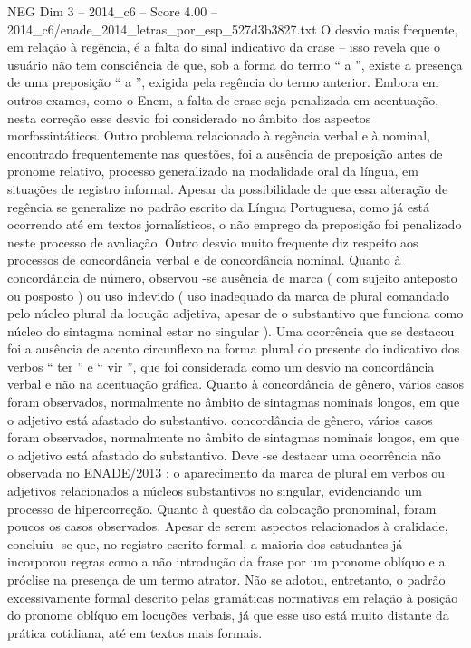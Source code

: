 \begin{textsample}{NEG Dim 3 – 2014\_c6 – Score 4.00 – 2014\_c6/enade\_2014\_letras\_por\_esp\_527d3b3827.txt}
O desvio mais frequente, em relação à regência, é a falta do sinal indicativo da crase – isso revela que o usuário não tem consciência de que, sob a forma do termo “ a ”, existe a presença de uma preposição “ a ”, exigida pela regência do termo anterior.
Embora em outros exames, como o Enem, a falta de crase seja penalizada em acentuação, nesta correção esse desvio foi considerado no âmbito dos aspectos morfossintáticos.
Outro problema relacionado à regência verbal e à nominal, encontrado frequentemente nas questões, foi a ausência de preposição antes de pronome relativo, processo generalizado na modalidade oral da língua, em situações de registro informal.
Apesar da possibilidade de que essa alteração de regência se generalize no padrão escrito da Língua Portuguesa, como já está ocorrendo até em textos jornalísticos, o não emprego da preposição foi penalizado neste processo de avaliação.
Outro desvio muito frequente diz respeito aos processos de concordância verbal e de concordância nominal.
Quanto à concordância de número, observou -se ausência de marca ( com sujeito anteposto ou posposto ) ou uso indevido ( uso inadequado da marca de plural comandado pelo núcleo plural da locução adjetiva, apesar de o substantivo que funciona como núcleo do sintagma nominal estar no singular ).
Uma ocorrência que se destacou foi a ausência de acento circunflexo na forma plural do presente do indicativo dos verbos “ ter ” e “ vir ”, que foi considerada como um desvio na concordância verbal e não na acentuação gráfica.
Quanto à concordância de gênero, vários casos foram observados, normalmente no âmbito de sintagmas nominais longos, em que o adjetivo está afastado do substantivo. concordância de gênero, vários casos foram observados, normalmente no âmbito de sintagmas nominais longos, em que o adjetivo está afastado do substantivo.
Deve -se destacar uma ocorrência não observada no ENADE/2013 : o aparecimento da marca de plural em verbos ou adjetivos relacionados a núcleos substantivos no singular, evidenciando um processo de hipercorreção.
Quanto à questão da colocação pronominal, foram poucos os casos observados.
Apesar de serem aspectos relacionados à oralidade, concluiu -se que, no registro escrito formal, a maioria dos estudantes já incorporou regras como a não introdução da frase por um pronome oblíquo e a próclise na presença de um termo atrator.
Não se adotou, entretanto, o padrão excessivamente formal descrito pelas gramáticas normativas em relação à posição do pronome oblíquo em locuções verbais, já que esse uso está muito distante da prática cotidiana, até em textos mais formais.

\end{textsample}
